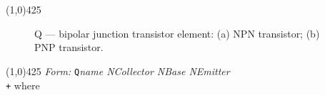 \oddsidemargin 10mm \topmargin 0.0in \textwidth 5.5in \textheight
7.375in \evensidemargin 1.0in \headheight 0.18in \footskip 0.16in
%
\section[Q \- Bipolar Junction Transistor]{}
\linethickness{1mm}
\line(1,0){425}
\normalsize
\begin{figure}[h]
\centering \epsfxsize=2.9in \caption[Q ---
bipolar junction transistor element]{Q --- bipolar junction
transistor element: (a) NPN transistor; (b) PNP transistor.}
\end{figure}
\linethickness{0.5mm} \line(1,0){425}
\newline
\textit{Form:}
\newline
{\tt Q}{\it name  NCollector NBase NEmitter}   \E  {}\E\\{\tt +} \E
\newline
where\\

